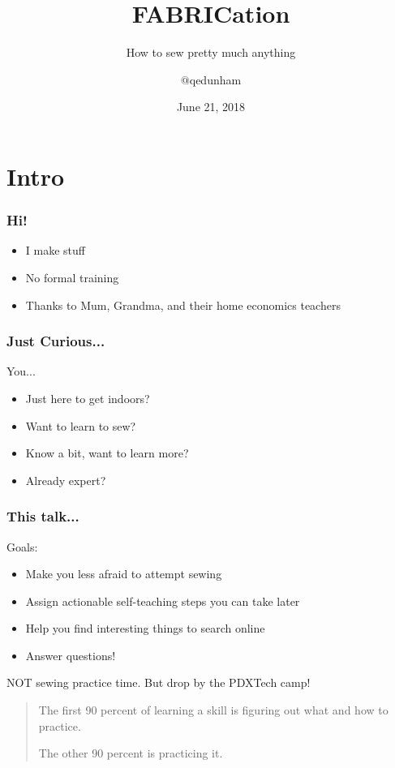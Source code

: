 \documentclass{beamer}
\title{FABRICation}
\subtitle{How to sew pretty much anything}
\author{$@$qedunham}
\institute{ToorCamp 2018}
\date{June 21, 2018}
\begin{document}
\begin{frame}[fragile]
\titlepage
\end{frame}

\section{Intro}

\begin{frame}[fragile]
\frametitle{Hi!}
\begin{itemize}
\item I make stuff
\item No formal training
\item Thanks to  Mum, Grandma, and their home economics teachers
\end{itemize}
\end{frame}

\begin{frame}[fragile]
\frametitle{Just Curious...}
You...
\begin{itemize}
\item Just here to get indoors?
\item Want to learn to sew?
\item Know a bit, want to learn more?
\item Already expert?
\end{itemize}
\end{frame}

\begin{frame}[fragile]
\frametitle{This talk...}
Goals:
\begin{itemize}
\item Make you less afraid to attempt sewing
\item Assign actionable self-teaching steps you can take later
\item Help you find interesting things to search online
\item Answer questions!
\end{itemize}
NOT sewing practice time. But drop by the PDXTech camp!
\end{frame}

\begin{frame}[fragile]
\begin{quote}
The first 90 percent of learning a skill is figuring out what and how to practice.

The other 90 percent is practicing it.
\end{quote}
\end{frame}
\end{document}
